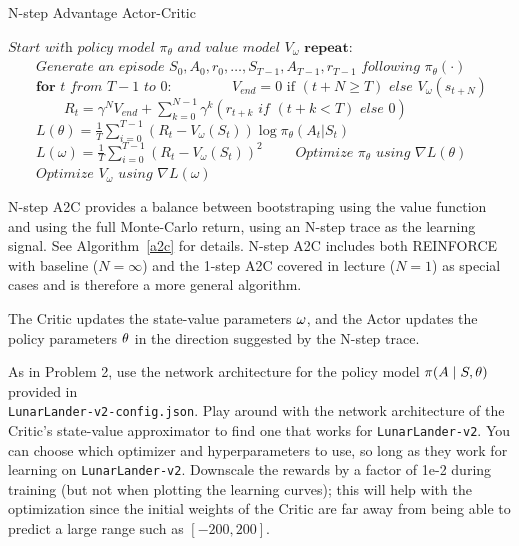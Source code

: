 \documentclass[12pt]{article}
\begin{document}
\begin{algorithm}
\label{alga2c}
\caption{N-step Advantage Actor-Critic\label{a2c}}
\begin{algorithmic}[1]
\State $\textit{Start with policy model } \pi_\theta \textit{ and value model } V_\omega$
\State $\textbf{repeat:}$
\State $\qquad\textit{Generate an episode } S_0, A_0, r_0, \ldots, S_{T-1}, A_{T-1}, r_{T-1} \textit{ following } \pi_\theta(\cdot)$
\State $\qquad\textbf{for } t \textit{ from } T-1 \textit{ to } 0$:
\State $\qquad\qquad V_{end} = 0 \text{ if } (t+N \geq T) \textit{ else } V_\omega(s_{t+N})$
\State $\qquad\qquad R_t = \gamma^{N} V_{end} + \sum_{k=0}^{N-1} \gamma^k \left(r_{t+k} \textit{ if } (t+k < T) \textit{ else } 0\right)$ 
\State $\qquad L(\theta) = \frac{1}{T} \sum_{i=0}^{T-1} (R_t - V_\omega(S_t)) \log \pi_\theta(A_t | S_t)$
\State $\qquad L(\omega) = \frac{1}{T} \sum_{i=0}^{T-1} (R_t - V_\omega(S_t))^2$
\State $\qquad\textit{Optimize } \pi_\theta \textit{ using } \nabla L(\theta)$
\State $\qquad\textit{Optimize } V_\omega \textit{ using } \nabla L(\omega)$
\EndProcedure
\end{algorithmic}
\end{algorithm}

N-step A2C provides a balance between bootstraping using the value function and using the full Monte-Carlo return, using an N-step trace as the learning signal. See Algorithm~\ref{a2c} for details. N-step A2C includes both REINFORCE with baseline ($N=\infty$) and the 1-step A2C covered in lecture ($N=1$) as special cases and is therefore a more general algorithm.

The Critic updates the state-value parameters $\bf{\omega}$, and the Actor updates the policy parameters $\bf{\theta}$ in the direction suggested by the N-step trace. 

As in Problem 2, use the network architecture for the policy model $\pi(A \mid S, \bf{\theta})$ provided in \\\texttt{LunarLander-v2-config.json}. Play around with the network architecture of the Critic's state-value approximator to find one that works for \texttt{LunarLander-v2}. You can choose which optimizer and hyperparameters to use, so long as they work for learning on \texttt{LunarLander-v2}. Downscale the rewards by a factor of 1e-2 during training (but not when plotting the learning curves); this will help with the optimization since the initial weights of the Critic are far away from being able to predict a large range such as $[-200, 200]$.
\end{document}
